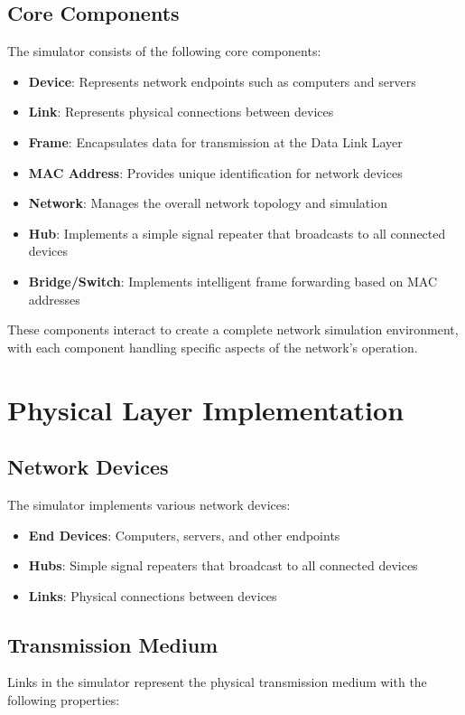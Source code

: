 \documentclass[12pt,a4paper]{article}
\begin{document}
\subsection{Core Components}
The simulator consists of the following core components:

\begin{itemize}
    \item \textbf{Device}: Represents network endpoints such as computers and servers
    \item \textbf{Link}: Represents physical connections between devices
    \item \textbf{Frame}: Encapsulates data for transmission at the Data Link Layer
    \item \textbf{MAC Address}: Provides unique identification for network devices
    \item \textbf{Network}: Manages the overall network topology and simulation
    \item \textbf{Hub}: Implements a simple signal repeater that broadcasts to all connected devices
    \item \textbf{Bridge/Switch}: Implements intelligent frame forwarding based on MAC addresses
\end{itemize}

These components interact to create a complete network simulation environment, with each component handling specific aspects of the network's operation.

\section{Physical Layer Implementation}
\subsection{Network Devices}
The simulator implements various network devices:

\begin{itemize}
    \item \textbf{End Devices}: Computers, servers, and other endpoints
    \item \textbf{Hubs}: Simple signal repeaters that broadcast to all connected devices
    \item \textbf{Links}: Physical connections between devices
\end{itemize}

\subsection{Transmission Medium}
Links in the simulator represent the physical transmission medium with the following properties:
\end{document}
